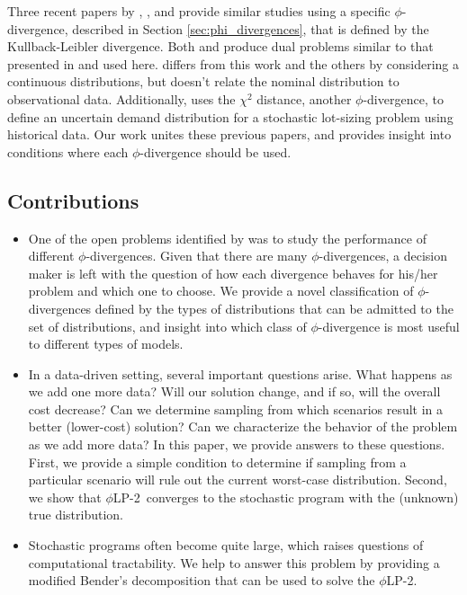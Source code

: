 \documentclass[ijoc,letterpaper]{informs3} %
\newcommand{\plp}{$\phi$LP-2}
\begin{document}
Three recent papers by \cite{wang2010likelihood}, \cite{calafiore2007ambiguous}, and \cite{hukullback} provide similar studies using a specific $\phi$-divergence, described in Section \ref{sec:phi_divergences}, that is defined by the Kullback-Leibler divergence.
Both \cite{wang2010likelihood} and \cite{hukullback} produce dual problems similar to that presented in \cite{bental2011robust} and used here.
\cite{hukullback} differs from this work and the others by considering a continuous distributions, but doesn't relate the nominal distribution to observational data.
Additionally, \cite{klabjan2013robust} uses the $\chi^2$ distance, another $\phi$-divergence, to define an uncertain demand distribution for a stochastic lot-sizing problem using historical data.
Our work unites these previous papers, and provides insight into conditions where each $\phi$-divergence should be used.

\subsection{Contributions}

\begin{itemize}
	\item One of the open problems identified by \cite{bental2011robust} was to study the performance of different $\phi$-divergences.
		Given that there are many $\phi$-divergences, a decision maker is left with the question of how each divergence behaves for his/her problem and which one to choose.
		We provide a novel classification of $\phi$-divergences defined by the types of distributions that can be admitted to the set of distributions, and insight into which class of $\phi$-divergence is most useful to different types of models.
		
	\item In a data-driven setting, several important questions arise.
		What happens as we add one more data?
		Will our solution change, and if so, will the overall cost decrease?
		Can we determine sampling from which scenarios result in a better (lower-cost) solution?
		Can we characterize the behavior of the problem as we add more data?
		In this paper, we provide answers to these questions.
		First, we provide a simple condition to determine if sampling from a particular scenario will rule out the current worst-case distribution.
		Second, we show that \plp\ converges to the stochastic program with the (unknown) true distribution.
		
	\item Stochastic programs often become quite large, which raises questions of computational tractability.
		We help to answer this problem by providing a modified Bender's decomposition that can be used to solve the \plp.
\end{itemize}
\end{document}

